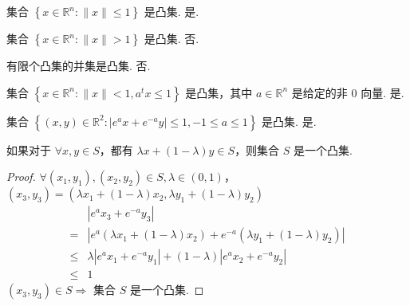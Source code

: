 

\usepackage{tikz}

\newcommand{\Title}{CVX final 2021}
\renewcommand{\due}{due: 11 weeks}
\newcommand{\dom}{\operatorname{dom}} %
\newcommand{\minimize}{\operatorname{minimize}} %
\newcommand{\subject}{\operatorname{subject\ to}}
\newcommand{\todo}{{\color{red} to do}} %
\newcommand{\myline}{{\line(1,0){450}}} %



\begin{problem}[判断]
    集合 $\left\{x \in \mathbb{R}^n: \|x\| \le 1\right\}$ 是凸集.
    \Answer 是.
\end{problem}

\begin{problem}[判断]
    集合 $\left\{x \in \mathbb{R}^n: \|x\| > 1\right\}$ 是凸集.
    \Answer 否.
\end{problem}

\begin{problem}[判断]
    有限个凸集的并集是凸集.
    \Answer 否.
\end{problem}

\begin{problem}[判断]
    集合 $\left\{x \in \mathbb{R}^n: \|x\| < 1, a^tx \le 1\right\}$ 是凸集，其中 $a \in \mathbb{R}^n$ 是给定的非 0 向量.
    \Answer 是.
\end{problem}

\begin{problem}[判断]
    集合 $\left\{(x, y) \in \mathbb{R}^2: |e^ax + e^{-a}y| \le 1, -1 \le a \le 1\right\}$ 是凸集.
    \Answer 是.
    \begin{theorem}
        如果对于 $\forall x, y \in S$，都有 $\lambda x + (1 - \lambda)y \in S$，则集合 $S$ 是一个凸集.
    \end{theorem}
    \begin{proof}
        $\forall (x_1, y_1), (x_2, y_2) \in S, \lambda \in (0, 1)$，$(x_3, y_3) = (\lambda x_1 + (1 - \lambda)x_2, \lambda y_1 + (1 - \lambda)y_2)$
        \begin{align*}
            &|e^ax_3 + e^{-a}y_3| \\
            =& |e^a(\lambda x_1 + (1 - \lambda)x_2) + e^{-a}(\lambda y_1 + (1 - \lambda)y_2)| \\
            \le& \lambda |e^ax_1 + e^{-a}y_1| + (1 - \lambda) |e^ax_2 + e^{-a}y_2| \\
            \le& 1
        \end{align*}
        $(x_3, y_3) \in S \Longrightarrow$ 集合 $S$ 是一个凸集.
    \end{proof}
\end{problem}

